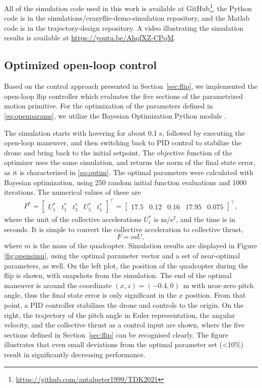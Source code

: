 All of the simulation code used in this work is available at GitHub\footnote{\url{https://github.com/antalpeter1999/TDK2021}}, the Python code is in the simulations/crazyflie-demo-simulation repository, and the Matlab code is in the trajectory-design repository. A video illustrating the simulation results is available at \url{https://youtu.be/AhqfXZ-CPqM}.

\subsection{Optimized open-loop control}\label{sec:opensimu}
Based on the control approach presented in Section~\ref{sec:flip}, we implemented the open-loop flip controller which evaluates the five sections of the parametrized motion primitive. For the optimization of the parameters defined in \eqref{eq:openparams}, we utilize the Bayesian Optimization Python module \cite{bayesopt}.%

The simulation starts with hovering for about 0.1 s, followed by executing the open-loop maneuver, and then switching back to PID control to stabilize the drone and bring back to the initial setpoint. The objective function of the optimizer uses the same simulation, and returns the norm of the final state error, as it is characterized in \eqref{eq:optim}. The optimal parameters were calculated with Bayesian optimization, using 250 random initial function evaluations and 1000 iterations. The numerical values of these are
\begin{align}\label{eq:optparam}
P^*=\begin{bmatrix}
U_1^* & t_1^* & t_3^* & U_5^*& t_5^*
\end{bmatrix} ^\top =  \begin{bmatrix}
17.5 & 0.12 & 0.16 & 17.95 & 0.075
\end{bmatrix}^\top,
\end{align}
where the unit of the collective accelerations $U_i^*$ is m/s$^2$, and the time is in seconds. It is simple to convert the collective acceleration to collective thrust, 
\begin{equation}
    F = m U,
\end{equation}
where $m$ is the mass of the quadcopter. Simulation results are displayed in Figure \ref{fig:opensimu}, using the optimal parameter vector and a set of near-optimal parameters, as well. On the left plot, the position of the quadcopter during the flip is shown, with snapshots from the simulation. The end of the optimal maneuver is around the coordinate $(x, z)=(-0.4, 0)$~m with near-zero pitch angle, thus the final state error is only significant in the $x$ position. From that point, a PID controller stabilizes the drone and controls to the origin. On the right, the trajectory of the pitch angle in Euler representation, the angular velocity, and the collective thrust as a control input are shown, where the five sections defined in Section~\ref{sec:flip} can be recognised clearly. The figure illustrates that even small deviations from the optimal parameter set (<10\%) result in significantly decreasing performance.

